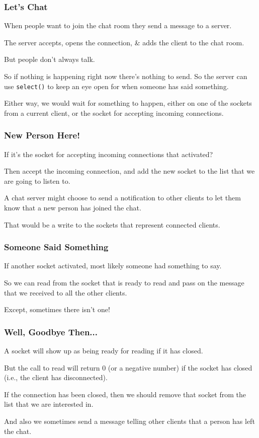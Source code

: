 \begin{frame}
\frametitle{Let's Chat}

When people want to join the chat room they send a message to a server. 

The server accepts, opens the connection, \& adds the client to the chat room.

 But people don't always talk. 
 
 So if nothing is happening right now there's nothing to send. So the server can use \texttt{select()} to keep an eye open for when someone has said something. 
 
 Either way, we would wait for something to happen, either on one of the sockets from a current client, or the socket for accepting incoming connections.

\end{frame}

\begin{frame}
\frametitle{New Person Here!}

If it's the socket for accepting incoming connections that activated?

Then accept the incoming connection, and add the new socket to the list that we are going to listen to. 

A chat server might choose to send a notification to other clients to let them know that a new person has joined the chat. 

That would be a write to the sockets that represent connected clients.

\end{frame}

\begin{frame}
\frametitle{Someone Said Something}

If another socket activated, most likely someone had something to say. 

So we can read from the socket that is ready to read and pass on the message that we received to all the other clients. 

Except, sometimes there isn't one!

\end{frame}

\begin{frame}
\frametitle{Well, Goodbye Then...}

A socket will show up as being ready for reading if it has closed. 

But the call to read will return 0 (or a negative number) if the socket has closed (i.e., the client has disconnected). 

If the connection has been closed, then we should remove that socket from the list that we are interested in. 

And also we sometimes send a message telling other clients that a person has left the chat.

\end{frame}


